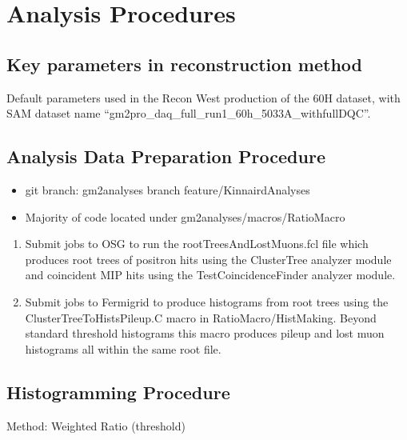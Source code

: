 \graphicspath{ {Figures/CBO/Frequency/} {Figures/VW/} }

\chapter{Analysis Procedures}
\label{Ch:Procedures}


\section{Key parameters in reconstruction method}

	Default parameters used in the Recon West production of the 60H dataset, with SAM dataset name ``gm2pro\_daq\_full\_run1\_60h\_5033A\_withfullDQC''.

\section{Analysis Data Preparation Procedure}

	\begin{itemize}
		\item{git branch: gm2analyses branch feature/KinnairdAnalyses}
		\item{Majority of code located under gm2analyses/macros/RatioMacro}
	\end{itemize}

	\begin{enumerate}
		\item{Submit jobs to OSG to run the rootTreesAndLostMuons.fcl file which produces root trees of positron hits using the ClusterTree analyzer module and coincident MIP hits using the TestCoincidenceFinder analyzer module.}
		\item{Submit jobs to Fermigrid to produce histograms from root trees using the ClusterTreeToHistsPileup.C macro in RatioMacro/HistMaking. Beyond standard threshold histograms this macro produces pileup and lost muon histograms all within the same root file.}
	\end{enumerate}


\section{Histogramming Procedure}

	Method: Weighted Ratio (threshold)

